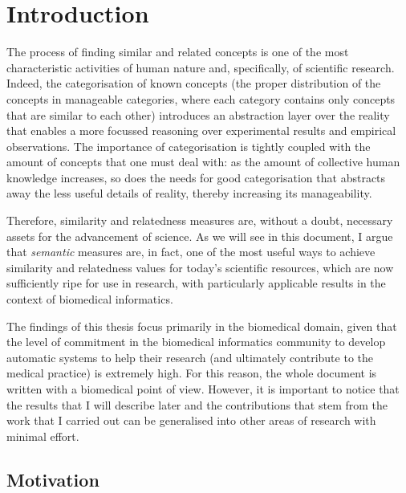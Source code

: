 \chapter{Introduction} \label{chap:intro}

The process of finding similar and related concepts is one of the most characteristic activities of human nature and, specifically, of scientific research. Indeed, the categorisation of known concepts (\ie the proper distribution of the concepts in manageable categories, where each category contains only concepts that are similar to each other) introduces an abstraction layer over the reality that enables a more focussed reasoning over experimental results and empirical observations. The importance of categorisation is tightly coupled with the amount of concepts that one must deal with: as the amount of collective human knowledge increases, so does the needs for good categorisation that abstracts away the less useful details of reality, thereby increasing its manageability.

Therefore, similarity and relatedness measures are, without a doubt, necessary assets for the advancement of science. As we will see in this document, I argue that \emph{semantic} measures are, in fact, one of the most useful ways to achieve similarity and relatedness values for today's scientific resources, which are now sufficiently ripe for use in research, with particularly applicable results in the context of biomedical informatics.

The findings of this thesis focus primarily in the biomedical domain, given that the level of commitment in the biomedical informatics community to develop automatic systems to help their research (and ultimately contribute to the medical practice) is extremely high. For this reason, the whole document is written with a biomedical point of view. However, it is important to notice that the results that I will describe later and the contributions that stem from the work that I carried out can be generalised into other areas of research with minimal effort.


\section{Motivation} \label{sec:intro/motivation}

